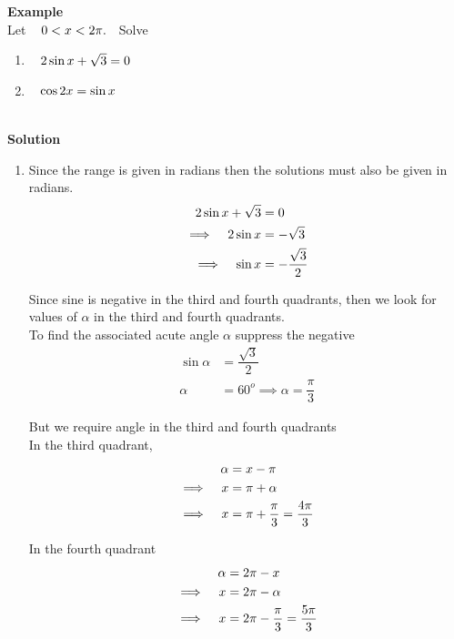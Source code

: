 \documentclass[11pt,a4paper]{article}
\begin{document}
\textbf{Example}\\
Let $\hspace{0.3cm} 0 < x < 2\pi.\hspace{0.2cm}$ Solve
\begin{enumerate}
\item[i.] $\hspace{0.3cm} 2\sin x + \sqrt{3} = 0$

\item[ii.] $\hspace{0.3cm} \cos 2x = \sin x$\\\\
\end{enumerate}



\textbf{Solution}
\begin{enumerate}
\item[i.]  Since the range is given in radians then the solutions must also be given in radians.
\begin{align*}
2\sin x + \sqrt{3} & = 0\\
\implies \hspace{0.3cm} 2\sin x & = - \sqrt{3}\\
\implies \hspace{0.3cm} \sin x & = -\dfrac{\sqrt{3}}{2}
\end{align*}


Since sine is negative in the third and fourth quadrants, then we look for values of $\alpha$ in the third and fourth quadrants.\\
To find the associated acute angle $\alpha$ suppress the negative
\begin{align*}
\sin \alpha & = \dfrac{\sqrt{3}}{2}\\
\alpha & = 60^o \implies \alpha = \dfrac{\pi}{3}
\end{align*}

But we require angle in the third and fourth quadrants\\

In the third quadrant, 
\begin{align*}
\alpha & = x - \pi\\
\implies\hspace{0.3cm} x &  = \pi + \alpha \\
\implies\hspace{0.3cm} x & = \pi + \dfrac{\pi}{3} = \dfrac{4\pi}{3}\\
\end{align*}

In the fourth quadrant
\begin{align*}
\alpha & = 2\pi - x\\
\implies\hspace{0.3cm} x & = 2\pi - \alpha\\
\implies \hspace{0.3cm} x & = 2\pi - \dfrac{\pi}{3} = \dfrac{5\pi}{3}\\
\end{align*}





\end{enumerate}
\end{document}
